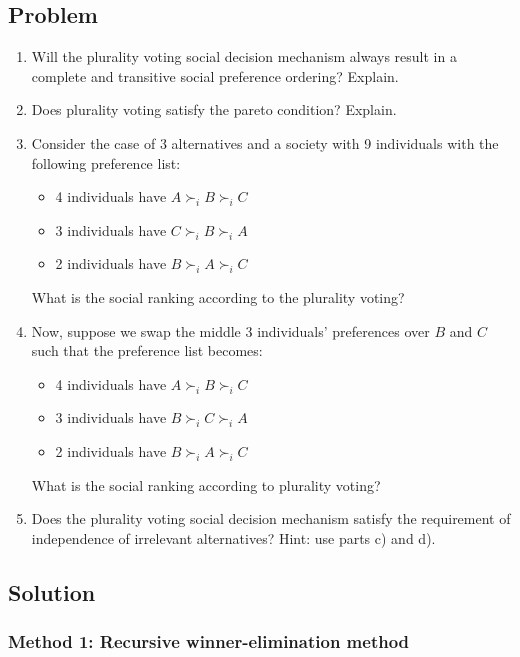 \documentclass[12pt]{article}
\begin{document}
\subsection{Problem}
\begin{enumerate}[label=(\alph*)]
    \item Will the plurality voting social decision mechanism always result in a complete and transitive social preference ordering? Explain.
    \item Does plurality voting satisfy the pareto condition? Explain.
    \item Consider the case of 3 alternatives and a society with 9 individuals with the following preference list:
    \begin{itemize}[leftmargin=2em]
        \item 4 individuals have $A \succ_i B \succ_i C$
        \item 3 individuals have $C \succ_i B \succ_i A$
        \item 2 individuals have $B \succ_i A \succ_i C$
    \end{itemize}
    What is the social ranking according to the plurality voting?
    \item Now, suppose we swap the middle 3 individuals' preferences over $B$ and $C$ such that the preference list becomes:
    \begin{itemize}[leftmargin=2em]
        \item 4 individuals have $A \succ_i B \succ_i C$
        \item 3 individuals have $B \succ_i C \succ_i A$
        \item 2 individuals have $B \succ_i A \succ_i C$
    \end{itemize}
    What is the social ranking according to plurality voting?
    \item Does the plurality voting social decision mechanism satisfy the requirement of independence of irrelevant alternatives? Hint: use parts c) and d).
\end{enumerate}

\newpage
\subsection{Solution}

\subsubsection{Method 1: Recursive winner-elimination method}
\end{document}
